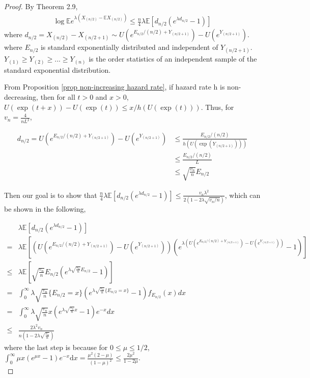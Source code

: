 \documentclass{article}
\theoremstyle{plain}
\begin{document}
\begin{proof}
By \cite{boucheron2012} Theorem 2.9, 
\begin{align}
    \log \mathbb{E} e^{\lambda\left(X_{(n / 2)}-\mathbb{E} X_{(n / 2)}\right)} \leq \frac{n}{4} \lambda \mathbb{E}\left[d_{n / 2}\left(e^{\lambda d_{n / 2}}-1\right)\right]
\end{align}
where $d_{n / 2}=X_{(n / 2)}-X_{(n / 2+1)} \sim U\left(e^{E_{n / 2} /(n / 2)+Y_{(n / 2+1)}} \right)-U\left(e^{Y_{(n / 2+1)}}\right).$ where $E_{n/2}$ is standard exponentially distributed and independent of $Y_{(n/2 + 1)}$. $Y_{(1)} \geq Y_{(2)} \geq ... \geq Y_{(n)}$ is the order statistics of an independent sample of the standard exponential distribution. 

From Proposition \ref{prop non-increasing hazard rate}, if hazard rate h is non-decreasing, then for all $t > 0$ and $x > 0$, $U(\exp (t+x))-U(\exp (t)) \leq x / h(U(\exp (t)))$. Thus, for $v_n = \frac{4}{n L^2}$,

\begin{align}
    d_{n/2} = U\left(e^{E_{n / 2} /(n / 2)+Y_{(n / 2+1)}} \right)-U\left(e^{Y_{(n / 2+1)}}\right) 
    & \leq \frac{E_{n / 2} /(n / 2)}{h(U(\exp{(Y_{(n/2+1)})}))}\\
    &\leq \frac{E_{n / 2} /(n / 2)}{L}\\
    & \leq \sqrt{\frac{v_n}{n}} E_{n/2}
\end{align}

Then our goal is to show that $\frac{n}{4} \lambda \mathbb{E}\left[d_{n / 2}\left(e^{\lambda d_{n / 2}}-1\right)\right] \leq \frac{v_{n} \lambda^{2}}{2\left(1-2 \lambda \sqrt{v_{n} / n}\right)}$, which can be shown in the following,

\begin{align}
    & \lambda \mathbb{E}\left[d_{n / 2}\left(e^{\lambda d_{n / 2}}-1\right)\right] \\
    = &  \lambda \mathbb{E}[\left(U\left(e^{E_{n / 2} /(n / 2)+Y_{(n / 2+1)}} \right)-U\left(e^{Y_{(n / 2+1)}}\right) \right) \left(e^{\lambda \left (U\left(e^{E_{n / 2} /(n / 2)+Y_{(n / 2+1)}} \right)-U\left(e^{Y_{(n / 2+1)}}\right) \right)} - 1\right)]\\
    \leq &  \lambda \mathbb{E}[\sqrt{\frac{v_{n}}{n}} E_{n / 2} \left(e^{\lambda \sqrt{\frac{v_{n}}{n}} E_{n / 2}} -1\right)]\\
    = &  \int_0^\infty \lambda  \sqrt{\frac{v_{n}}{n}} \{ E_{n / 2}  = x \} \left(e^{\lambda \sqrt{\frac{v_{n}}{n}} \{E_{n / 2} = x\}} -1\right) f_{E_{n/2}}(x) d x\\
    =  & \int_0^\infty \lambda  \sqrt{\frac{v_{n}}{n}} x \left(e^{\lambda \sqrt{\frac{v_{n}}{n}} x } -1\right) e^{-x} d x\\
    \leq &  \frac{2\lambda^2 v_n}{n (1 - 2 \lambda \sqrt{\frac{v_n}{n}})}
\end{align}
where the last step is because for $0 \leq \mu \leq 1/2$, $\int_{0}^{\infty} \mu x\left(e^{\mu x}-1\right) e^{-x} \mathrm{d} x=\frac{\mu^{2}(2-\mu)}{(1-\mu)^{2}} \leq \frac{2 \mu^{2}}{1-2 \mu}$.\\


\end{proof}
\end{document}
